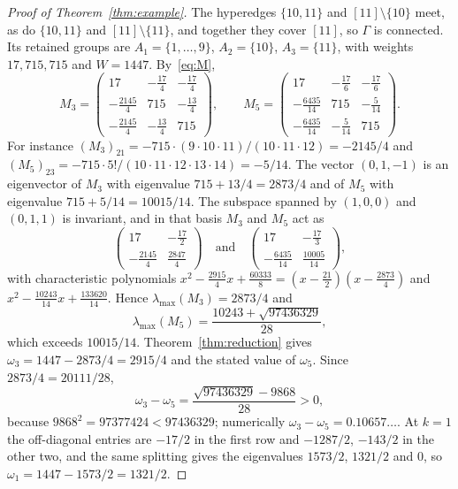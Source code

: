 \documentclass[11pt]{amsart}
\theoremstyle{remark}
\numberwithin{equation}{section}
\begin{document}
\begin{proof}[Proof of Theorem~\ref{thm:example}]
The hyperedges $\{10,11\}$ and $[11]\setminus\{10\}$ meet, as do $\{10,11\}$ and $[11]\setminus\{11\}$, and together they cover $[11]$, so $\Gamma$ is connected. Its retained groups are $A_1=\{1,\dots,9\}$, $A_2=\{10\}$, $A_3=\{11\}$, with weights $17,715,715$ and $W=1447$. By~\eqref{eq:M},
\[
M_3=\begin{pmatrix}17&-\frac{17}4&-\frac{17}4\\[2pt]-\frac{2145}4&715&-\frac{13}4\\[2pt]-\frac{2145}4&-\frac{13}4&715\end{pmatrix},\qquad
M_5=\begin{pmatrix}17&-\frac{17}6&-\frac{17}6\\[2pt]-\frac{6435}{14}&715&-\frac5{14}\\[2pt]-\frac{6435}{14}&-\frac5{14}&715\end{pmatrix}.
\]
For instance $(M_3)_{21}=-715\cdot(9\cdot10\cdot11)/(10\cdot11\cdot12)=-2145/4$ and $(M_5)_{23}=-715\cdot5!/(10\cdot11\cdot12\cdot13\cdot14)=-5/14$. The vector $(0,1,-1)$ is an eigenvector of $M_3$ with eigenvalue $715+13/4=2873/4$ and of $M_5$ with eigenvalue $715+5/14=10015/14$. The subspace spanned by $(1,0,0)$ and $(0,1,1)$ is invariant, and in that basis $M_3$ and $M_5$ act as
\[
\begin{pmatrix}17&-\frac{17}2\\[2pt]-\frac{2145}4&\frac{2847}4\end{pmatrix}\quad\text{and}\quad
\begin{pmatrix}17&-\frac{17}3\\[2pt]-\frac{6435}{14}&\frac{10005}{14}\end{pmatrix},
\]
with characteristic polynomials $x^2-\frac{2915}4x+\frac{60333}8=(x-\frac{21}2)(x-\frac{2873}4)$ and $x^2-\frac{10243}{14}x+\frac{133620}{14}$. Hence $\lambda_{\max}(M_3)=2873/4$ and
\[
\lambda_{\max}(M_5)=\frac{10243+\sqrt{97436329}}{28},
\]
which exceeds $10015/14$. Theorem~\ref{thm:reduction} gives $\omega_3=1447-2873/4=2915/4$ and the stated value of $\omega_5$. Since $2873/4=20111/28$,
\[
\omega_3-\omega_5=\frac{\sqrt{97436329}-9868}{28}>0,
\]
because $9868^2=97377424<97436329$; numerically $\omega_3-\omega_5=0.10657\ldots$. At $k=1$ the off-diagonal entries are $-17/2$ in the first row and $-1287/2$, $-143/2$ in the other two, and the same splitting gives the eigenvalues $1573/2$, $1321/2$ and $0$, so $\omega_1=1447-1573/2=1321/2$.
\end{proof}
\end{document}
